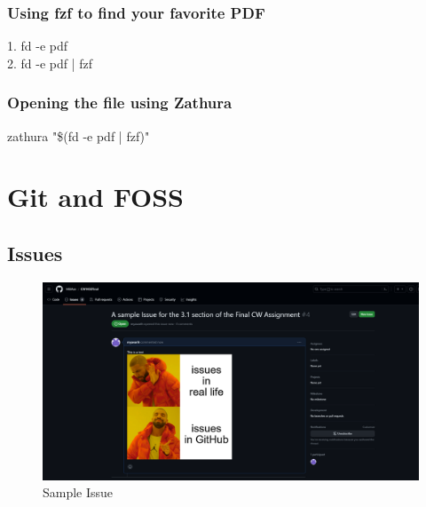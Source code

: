 \documentclass[titlepage]{article}
\begin{document}
\subsubsection{Using fzf to find your favorite PDF}
1. fd -e pdf\\
2. fd -e pdf | fzf
\subsubsection{Opening the file using Zathura}
zathura "\$(fd -e pdf | fzf)"
\section{Git and FOSS}
\subsection{Issues}
\begin{figure}
	\centering
	\includegraphics[width=0.7\linewidth]{screenshot001}
	\caption{Sample Issue}
	\label{fig:screenshot001}
\end{figure}
\end{document}
